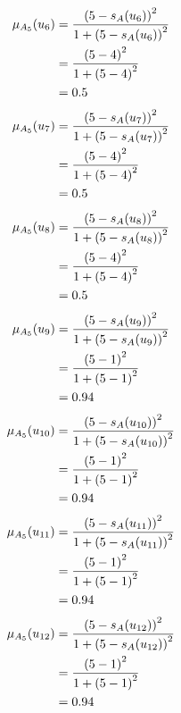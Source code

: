 \documentclass[a4paper]{book}
\begin{document}
				\begin{align}
					\mu_{A_5}(u_6) &= \frac{\left(5-s_A(u_6)\right)^2}{1 + \left(5-s_A(u_6)\right)^2}\\
					&= \frac{\left(5-4\right)^2}{1 + \left(5-4\right)^2} \notag \\
					&= 0.5 \notag
				\end{align}
				\begin{align}
					\mu_{A_5}(u_7) &= \frac{\left(5-s_A(u_7)\right)^2}{1 + \left(5-s_A(u_7)\right)^2}\\
					&= \frac{\left(5-4\right)^2}{1 + \left(5-4\right)^2} \notag \\
					&= 0.5 \notag
				\end{align}
				\begin{align}
					\mu_{A_5}(u_8) &= \frac{\left(5-s_A(u_8)\right)^2}{1 + \left(5-s_A(u_8)\right)^2}\\
					&= \frac{\left(5-4\right)^2}{1 + \left(5-4\right)^2} \notag \\
					&= 0.5 \notag
				\end{align}
				\begin{align}
					\mu_{A_5}(u_9) &= \frac{\left(5-s_A(u_9)\right)^2}{1 + \left(5-s_A(u_9)\right)^2}\\
					&= \frac{\left(5-1\right)^2}{1 + \left(5-1\right)^2} \notag \\
					&= 0.94 \notag
				\end{align}
				\begin{align}
					\mu_{A_5}(u_{10}) &= \frac{\left(5-s_A(u_{10})\right)^2}{1 + \left(5-s_A(u_{10})\right)^2}\\
					&= \frac{\left(5-1\right)^2}{1 + \left(5-1\right)^2} \notag \\
					&= 0.94 \notag
				\end{align}
				\begin{align}
					\mu_{A_5}(u_{11}) &= \frac{\left(5-s_A(u_{11})\right)^2}{1 + \left(5-s_A(u_{11})\right)^2}\\
					&= \frac{\left(5-1\right)^2}{1 + \left(5-1\right)^2} \notag \\
					&= 0.94 \notag
				\end{align}
				\begin{align}
					\mu_{A_5}(u_{12}) &= \frac{\left(5-s_A(u_{12})\right)^2}{1 + \left(5-s_A(u_{12})\right)^2}\\
					&= \frac{\left(5-1\right)^2}{1 + \left(5-1\right)^2} \notag \\
					&= 0.94 \notag
				\end{align}
\end{document}
